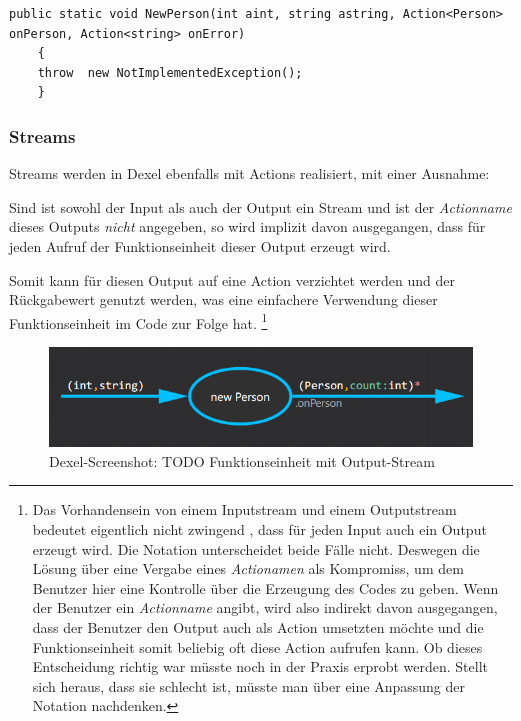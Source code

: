 	

	
	\begin{lstlisting}[caption=Mit Dexel generierter Code ]
	public static void NewPerson(int aint, string astring, Action<Person> onPerson, Action<string> onError)
	{
	throw  new NotImplementedException();
	}
	\end{lstlisting}
	 \subsubsection{Streams}

	Streams werden in Dexel ebenfalls mit Actions realisiert, mit einer Ausnahme:
	
	Sind ist sowohl der Input als auch der Output ein Stream und ist der \textit{Actionname} dieses Outputs \textit{nicht} angegeben, so wird  implizit davon ausgegangen, dass für jeden Aufruf der Funktionseinheit dieser Output erzeugt wird. 
	
	Somit kann für diesen Output auf eine Action verzichtet werden und der Rückgabewert genutzt werden, was eine einfachere Verwendung dieser Funktionseinheit im Code zur Folge hat.
	\footnote{	Das Vorhandensein von einem Inputstream und einem Outputstream bedeutet eigentlich nicht zwingend , dass für jeden Input auch ein	Output erzeugt wird. Die Notation unterscheidet beide Fälle nicht. Deswegen die Lösung über eine Vergabe eines \textit{Actionamen} als Kompromiss, um dem Benutzer hier eine Kontrolle über die Erzeugung des Codes zu geben. Wenn der Benutzer ein \textit{Actionname} angibt, wird also indirekt davon ausgegangen, dass der Benutzer den Output auch als Action umsetzten möchte und die Funktionseinheit somit beliebig oft diese Action aufrufen kann. Ob dieses Entscheidung richtig war müsste  noch in der Praxis erprobt werden. Stellt sich heraus,	dass sie schlecht ist, müsste man über eine Anpassung der Notation nachdenken.}
	
		
		\begin{figure}[H]
			\centering
			\includegraphics[width=.9\linewidth]{./img/roslyn_Stream.png} 
			\caption{Dexel-Screenshot: TODO Funktionseinheit mit Output-Stream}
		\end{figure}
		
